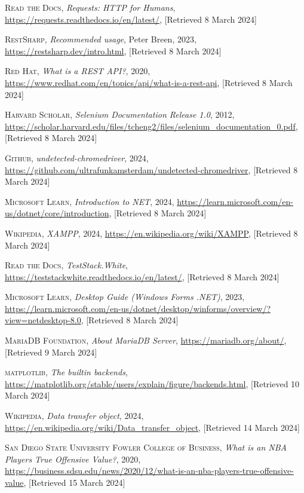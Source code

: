 \documentclass{thesis-ekf}
\theoremstyle{definition}
\theoremstyle{remark}
\begin{document}
\begin{thebibliography}{2}
\textsc{Read the Docs},
\emph{Requests: HTTP for Humans},
\url{https://requests.readthedocs.io/en/latest/}, [Retrieved 8 March 2024]

\textsc{RestSharp},
\emph{Recommended usage}, Peter Breen, 2023,
\url{https://restsharp.dev/intro.html}, [Retrieved 8 March 2024]

\textsc{Red Hat},
\emph{What is a REST API?}, 2020, 
\url{https://www.redhat.com/en/topics/api/what-is-a-rest-api}, [Retrieved 8 March 2024]

\textsc{Harvard Scholar},
\emph{Selenium Documentation Release 1.0}, 2012, 
\url{https://scholar.harvard.edu/files/tcheng2/files/selenium_documentation_0.pdf}, [Retrieved 8 March 2024]

\textsc{Github},
\emph{undetected-chromedriver}, 2024, 
\url{https://github.com/ultrafunkamsterdam/undetected-chromedriver}, [Retrieved 8 March 2024]

\textsc{Microsoft Learn},
\emph{Introduction to NET}, 2024, 
\url{https://learn.microsoft.com/en-us/dotnet/core/introduction}, [Retrieved 8 March 2024]

\textsc{Wikipedia},
\emph{XAMPP}, 2024,
\url{https://en.wikipedia.org/wiki/XAMPP}, [Retrieved 8 March 2024]

\textsc{Read the Docs},
\emph{TestStack.White},
\url{https://teststackwhite.readthedocs.io/en/latest/}, [Retrieved 8 March 2024]

\textsc{Microsoft Learn},
\emph{Desktop Guide (Windows Forms .NET)}, 2023,
\url{https://learn.microsoft.com/en-us/dotnet/desktop/winforms/overview/?view=netdesktop-8.0}, [Retrieved 8 March 2024]

\textsc{MariaDB Foundation},
\emph{About MariaDB Server},
\url{https://mariadb.org/about/}, [Retrieved 9 March 2024]

\textsc{matplotlib},
\emph{The builtin backends},
\url{https://matplotlib.org/stable/users/explain/figure/backends.html}, [Retrieved 10 March 2024]

\textsc{Wikipedia},
\emph{Data transfer object}, 2024,
\url{https://en.wikipedia.org/wiki/Data_transfer_object}, [Retrieved 14 March 2024]

\textsc{San Diego State University Fowler College of Business},
\emph{What is an NBA Players True Offensive Value?}, 2020,
\url{https://business.sdsu.edu/news/2020/12/what-is-an-nba-players-true-offensive-value}, [Retrieved 15 March 2024]


\end{thebibliography}
\end{document}
